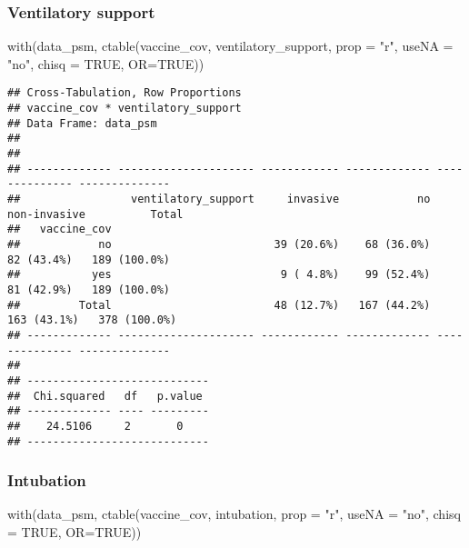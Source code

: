 \documentclass[
]{article}
\newenvironment{Shaded}{\begin{snugshade}}{\end{snugshade}}
\newcommand{\AttributeTok}[1]{\textcolor[rgb]{0.77,0.63,0.00}{#1}}
\newcommand{\ConstantTok}[1]{\textcolor[rgb]{0.00,0.00,0.00}{#1}}
\newcommand{\FunctionTok}[1]{\textcolor[rgb]{0.00,0.00,0.00}{#1}}
\newcommand{\NormalTok}[1]{#1}
\newcommand{\StringTok}[1]{\textcolor[rgb]{0.31,0.60,0.02}{#1}}
\begin{document}
\hypertarget{ventilatory-support-1}{%
\subsubsection{Ventilatory support}\label{ventilatory-support-1}}

\begin{Shaded}
\begin{Highlighting}[]
\FunctionTok{with}\NormalTok{(data\_psm, }\FunctionTok{ctable}\NormalTok{(vaccine\_cov, ventilatory\_support, }\AttributeTok{prop =} \StringTok{"r"}\NormalTok{, }\AttributeTok{useNA =} \StringTok{"no"}\NormalTok{, }\AttributeTok{chisq =} \ConstantTok{TRUE}\NormalTok{, }\AttributeTok{OR=}\ConstantTok{TRUE}\NormalTok{))}
\end{Highlighting}
\end{Shaded}

\begin{verbatim}
## Cross-Tabulation, Row Proportions  
## vaccine_cov * ventilatory_support  
## Data Frame: data_psm  
## 
## 
## ------------- --------------------- ------------ ------------- -------------- --------------
##                 ventilatory_support     invasive            no   non-invasive          Total
##   vaccine_cov                                                                               
##            no                         39 (20.6%)    68 (36.0%)     82 (43.4%)   189 (100.0%)
##           yes                          9 ( 4.8%)    99 (52.4%)     81 (42.9%)   189 (100.0%)
##         Total                         48 (12.7%)   167 (44.2%)    163 (43.1%)   378 (100.0%)
## ------------- --------------------- ------------ ------------- -------------- --------------
## 
## ----------------------------
##  Chi.squared   df   p.value 
## ------------- ---- ---------
##    24.5106     2       0    
## ----------------------------
\end{verbatim}

\hypertarget{intubation-1}{%
\subsubsection{Intubation}\label{intubation-1}}

\begin{Shaded}
\begin{Highlighting}[]
\FunctionTok{with}\NormalTok{(data\_psm, }\FunctionTok{ctable}\NormalTok{(vaccine\_cov, intubation, }\AttributeTok{prop =} \StringTok{"r"}\NormalTok{, }\AttributeTok{useNA =} \StringTok{"no"}\NormalTok{, }\AttributeTok{chisq =} \ConstantTok{TRUE}\NormalTok{, }\AttributeTok{OR=}\ConstantTok{TRUE}\NormalTok{))}
\end{Highlighting}
\end{Shaded}
\end{document}
